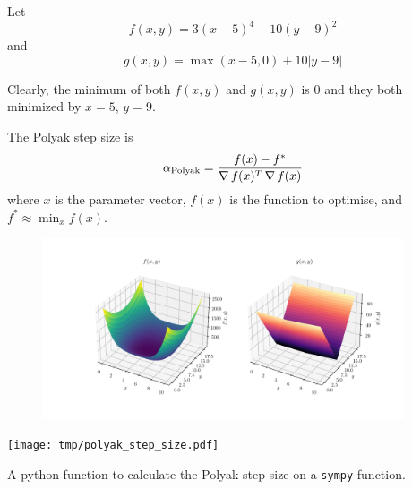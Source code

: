
Let \begin{equation}
  f(x,y)=3(x-5)^4+10(y-9)^2
  \label{eq:f}
\end{equation}
and 
\begin{equation}
  g(x,y)=\max(x-5,0)+10|y-9|
  \label{eq:g}
\end{equation}


Clearly, the minimum of both $f(x,y)$ and $g(x,y)$ is $0$ and they both minimized by $x=5$, $y=9$.

The Polyak step size is \begin{equation}
  \alpha_{\text{Polyak}}=\frac{f(x)-f^*}{\operatorname*{\nabla} f(x)^T\operatorname*{\nabla} f(x)}
  \label{eq:polyak-step}
\end{equation}
where $x$ is the parameter vector, $f(x)$ is the function to optimise, and $f^*\approx\min_xf(x)$.

\begin{figure}
  \begin{center}
    \includegraphics[width=0.95\textwidth]{fig/f-g.pdf}
  \end{center}
  \caption{}\label{fig:f-and-g}
\end{figure}

\begin{listing}
  \texttt{[image: tmp/polyak\_step\_size.pdf]}
  \caption{A python function to calculate the Polyak step size on a \texttt{sympy} function.}
  \label{lst:polyak-step}
\end{listing}
